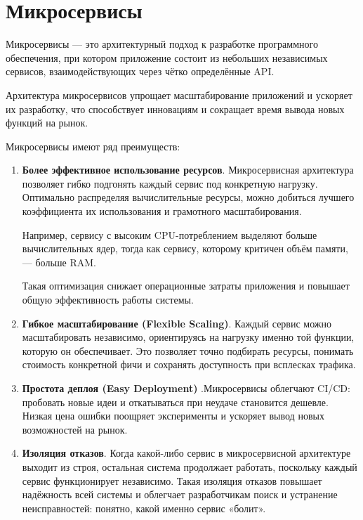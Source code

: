 \section{Микросервисы}

Микросервисы — это архитектурный подход к разработке программного обеспечения, при котором приложение состоит из небольших независимых сервисов, взаимодействующих через чётко определённые API. 

Архитектура микросервисов упрощает масштабирование приложений и ускоряет их разработку, что способствует инновациям и сокращает время вывода новых функций на рынок.


Микросервисы имеют ряд преимуществ:
\begin{enumerate}[label=\arabic*)]

   \item \textbf{Более эффективное использование ресурсов}.
Микросервисная архитектура позволяет гибко подгонять каждый сервис под конкретную нагрузку. Оптимально распределяя вычислительные ресурсы, можно добиться лучшего коэффициента их использования и грамотного масштабирования.

Например, сервису с высоким CPU-потреблением выделяют больше вычислительных ядер, тогда как сервису, которому критичен объём памяти, — больше RAM.

Такая оптимизация снижает операционные затраты приложения и повышает общую эффективность работы системы.

     \item  \textbf{Гибкое масштабирование (Flexible Scaling)}.	 Каждый сервис можно масштабировать независимо, ориентируясь на нагрузку именно той функции, которую он обеспечивает. Это позволяет точно подбирать ресурсы, понимать стоимость конкретной фичи и сохранять доступность при всплесках трафика.
   \item \textbf{Простота деплоя (Easy Deployment)	}.Микросервисы облегчают CI/CD: пробовать новые идеи и откатываться при неудаче становится дешевле. Низкая цена ошибки поощряет эксперименты и ускоряет вывод новых возможностей на рынок.
   \item \textbf{Изоляция отказов}.
Когда какой-либо сервис в микросервисной архитектуре выходит из строя, остальная система продолжает работать, поскольку каждый сервис функционирует независимо. Такая изоляция отказов повышает надёжность всей системы и облегчает разработчикам поиск и устранение неисправностей: понятно, какой именно сервис «болит».


\end{enumerate}


